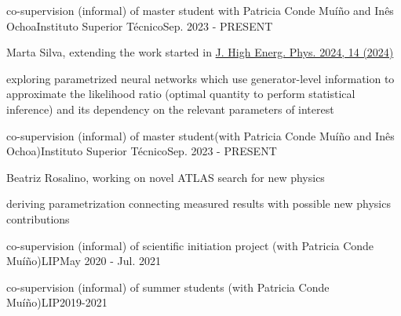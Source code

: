 
\begin{cventries}
    {co-supervision (informal) of master student with Patricia Conde Muíño and Inês Ochoa}{Instituto Superior Técnico}{Sep. 2023 - PRESENT}
    {
        \begin{cvitems}
            \item {Marta Silva, extending the work started in \href{https://doi.org/10.1007/JHEP04(2024)014}{J. High Energ. Phys. 2024, 14 (2024)}}
            \item {exploring parametrized neural networks which use generator-level information to approximate the likelihood ratio (optimal quantity to perform statistical inference) and its dependency on the relevant parameters of interest}
        \end{cvitems}
    }\vspace*{2mm}

    {co-supervision (informal) of master student(with Patricia Conde Muíño and Inês Ochoa)}{Instituto Superior Técnico}{Sep. 2023 - PRESENT}
    {
        \begin{cvitems}
            \item {Beatriz Rosalino, working on novel ATLAS search for new physics}
            \item {deriving parametrization connecting measured results with possible new physics contributions}
        \end{cvitems}
    }
    
    {co-supervision (informal) of scientific initiation project (with Patricia Conde Muíño)}{LIP}{May 2020 - Jul. 2021}
    {
    }

    {co-supervision (informal) of summer students (with Patricia Conde Muíño)}{LIP}{2019-2021}
    {}

\end{cventries}